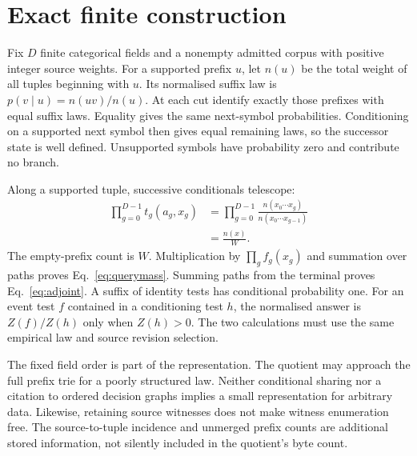 \section{Exact finite construction}
\label{app:dm-conditional}
Fix \(D\) finite categorical fields and a nonempty admitted corpus with positive integer source weights.
For a supported prefix \(u\), let \(n(u)\) be the total weight of all tuples beginning with \(u\).
Its normalised suffix law is \(p(v\mid u)=n(uv)/n(u)\).
At each cut identify exactly those prefixes with equal suffix laws.
Equality gives the same next-symbol probabilities.
Conditioning on a supported next symbol then gives equal remaining laws, so the successor state is well defined.
Unsupported symbols have probability zero and contribute no branch.

Along a supported tuple, successive conditionals telescope:
\begin{equation}
 \begin{aligned}
 \prod_{g=0}^{D-1}t_g(a_g,x_g)
 &=\prod_{g=0}^{D-1}\frac{n(x_0\cdots x_g)}{n(x_0\cdots x_{g-1})}\\
 &=\frac{n(x)}{W}.
 \end{aligned}
\end{equation}
The empty-prefix count is \(W\).
Multiplication by \(\prod_gf_g(x_g)\) and summation over paths proves Eq.~\eqref{eq:querymass}.
Summing paths from the terminal proves Eq.~\eqref{eq:adjoint}.
A suffix of identity tests has conditional probability one.
For an event test \(f\) contained in a conditioning test \(h\), the normalised answer is \(Z(f)/Z(h)\) only when \(Z(h)>0\).
The two calculations must use the same empirical law and source revision selection.

The fixed field order is part of the representation.
The quotient may approach the full prefix trie for a poorly structured law.
Neither conditional sharing nor a citation to ordered decision graphs implies a small representation for arbitrary data.
Likewise, retaining source witnesses does not make witness enumeration free.
The source-to-tuple incidence and unmerged prefix counts are additional stored information, not silently included in the quotient's byte count.

